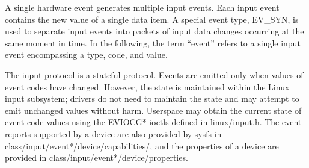 \documentclass[a4paper,8pt,english]{sphinxmanual}
\begin{document}
A single hardware event generates multiple input events. Each input event
contains the new value of a single data item. A special event type, EV\_SYN, is
used to separate input events into packets of input data changes occurring at
the same moment in time. In the following, the term ``event'' refers to a single
input event encompassing a type, code, and value.

The input protocol is a stateful protocol. Events are emitted only when values
of event codes have changed. However, the state is maintained within the Linux
input subsystem; drivers do not need to maintain the state and may attempt to
emit unchanged values without harm. Userspace may obtain the current state of
event code values using the EVIOCG* ioctls defined in linux/input.h. The event
reports supported by a device are also provided by sysfs in
class/input/event*/device/capabilities/, and the properties of a device are
provided in class/input/event*/device/properties.
\end{document}
